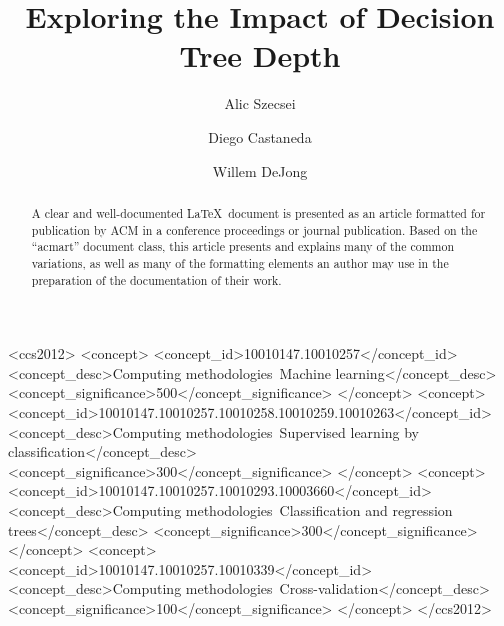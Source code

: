 \documentclass[screen, authorversion, nonacm, sigconf]{acmart}
\begin{document}
\title{Exploring the Impact of Decision Tree Depth}

\author{Alic Szecsei}

\author{Diego Castaneda}

\author{Willem DeJong}

\begin{abstract}
  A clear and well-documented \LaTeX\ document is presented as an
  article formatted for publication by ACM in a conference proceedings
  or journal publication. Based on the ``acmart'' document class, this
  article presents and explains many of the common variations, as well
  as many of the formatting elements an author may use in the
  preparation of the documentation of their work.
\end{abstract}

\begin{CCSXML}
<ccs2012>
<concept>
<concept_id>10010147.10010257</concept_id>
<concept_desc>Computing methodologies~Machine learning</concept_desc>
<concept_significance>500</concept_significance>
</concept>
<concept>
<concept_id>10010147.10010257.10010258.10010259.10010263</concept_id>
<concept_desc>Computing methodologies~Supervised learning by classification</concept_desc>
<concept_significance>300</concept_significance>
</concept>
<concept>
<concept_id>10010147.10010257.10010293.10003660</concept_id>
<concept_desc>Computing methodologies~Classification and regression trees</concept_desc>
<concept_significance>300</concept_significance>
</concept>
<concept>
<concept_id>10010147.10010257.10010339</concept_id>
<concept_desc>Computing methodologies~Cross-validation</concept_desc>
<concept_significance>100</concept_significance>
</concept>
</ccs2012>
\end{CCSXML}



\maketitle
\end{document}

